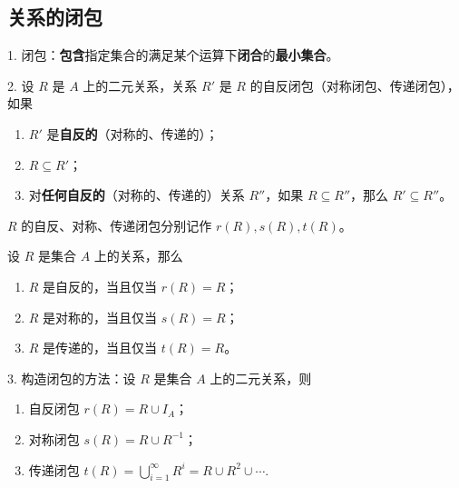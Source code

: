 \documentclass[normal,cyan]{elegantnote}
\begin{document}
\subsection{关系的闭包}
1. 闭包：\textbf{包含}指定集合的满足某个运算下\textbf{闭合}的\textbf{最小集合}。

2. 设 $R$ 是 $A$ 上的二元关系，关系 $R'$ 是 $R$ 的{\color{red}自反闭包}（对称闭包、传递闭包），如果
\begin{enumerate}
    \item $R'$ 是\textbf{自反的}（对称的、传递的）；
    \item $R \subseteq R'$；
    \item 对\textbf{任何自反的}（对称的、传递的）关系 $R''$，如果 $R \subseteq R''$，那么 $R' \subseteq R''$。
\end{enumerate}
$R$ 的自反、对称、传递闭包分别记作 $r(R),s(R),t(R)$。
\begin{theorem}
    设 $R$ 是集合 $A$ 上的关系，那么
    \begin{enumerate}
        \item $R$ 是自反的，当且仅当 $r(R) = R$；
        \item $R$ 是对称的，当且仅当 $s(R) = R$；
        \item $R$ 是传递的，当且仅当 $t(R) = R$。
    \end{enumerate}
\end{theorem}
3. 构造闭包的方法：设 $R$ 是集合 $A$ 上的二元关系，则
\begin{enumerate}
    \item 自反闭包 $r(R) = R \cup I_A$；
    \item 对称闭包 $s(R) = R \cup R^{-1}$；
    \item 传递闭包 $t(R) = \bigcup\limits_{i = 1}^{\infty} R^i = R \cup R^2 \cup \cdots$.
\end{enumerate}
\end{document}
